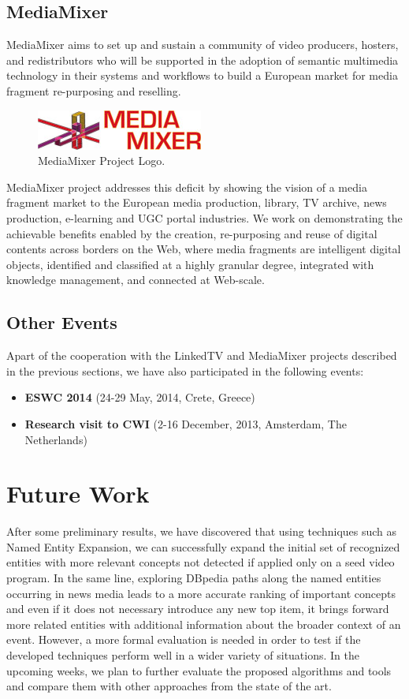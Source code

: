 \documentclass[a4paper,11pt]{report}
\begin{document}
\section{MediaMixer}
MediaMixer aims to set up and sustain a community of video producers, hosters, and redistributors who will be supported in the adoption of semantic multimedia technology in their systems and workflows to build a European market for media fragment re-purposing and reselling.
\begin{figure} [h]
\centering
\includegraphics [scale=0.50] {figure/mediamixer_logo.jpg}
\caption{MediaMixer Project Logo.}
\label{fig:linkedtv_logo}
\end{figure}

MediaMixer project addresses this deficit by showing the vision of a media fragment market to the European media production, library, TV archive, news production, e-learning and UGC portal industries. We work on demonstrating the achievable benefits enabled by the creation, re-purposing and reuse of digital contents across borders on the Web, where media fragments are intelligent digital objects, identified and classified at a highly granular degree, integrated with knowledge management, and connected at Web-scale.

\section{Other Events}
Apart of the cooperation with the LinkedTV and MediaMixer projects described in the previous sections, we have also participated in the following events:
\begin{itemize}
  \item \textbf{ESWC 2014} (24-29 May, 2014, Crete, Greece)
  \item \textbf{Research visit to CWI} (2-16 December, 2013, Amsterdam, The Netherlands)
\end{itemize}


\chapter{Future Work}
\label{future}
After some preliminary results, we have discovered that using techniques such as Named Entity Expansion, we can successfully expand the initial set of recognized entities with more relevant concepts not detected if applied only on a seed video program. In the same line, exploring DBpedia paths along the named entities occurring in news media leads to a more accurate ranking of important concepts and even if it does not necessary introduce any new top item, it brings forward more related entities with additional information about the broader context of an event. However, a more formal evaluation is needed in order to test if the developed techniques perform well in a wider variety of situations. In the upcoming weeks, we plan to further evaluate the proposed algorithms and tools and compare them with other approaches from the state of the art.
\end{document}
